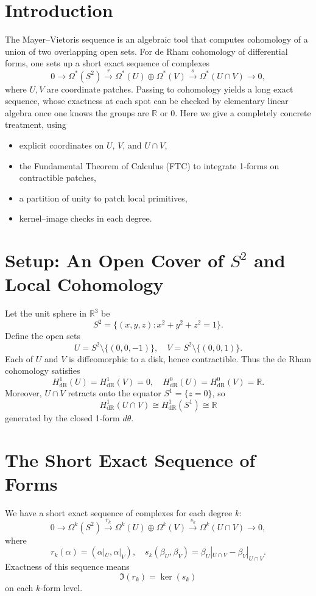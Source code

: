 \documentclass[11pt]{article}
\newcommand{\R}{\mathbb{R}}
\begin{document}
	\section{Introduction}
	The Mayer–Vietoris sequence is an algebraic tool that computes cohomology of a union of two overlapping open sets.  For de Rham cohomology of differential forms, one sets up a short exact sequence of complexes
	\[
	0\rightarrow \Omega^*(S^2) \xrightarrow{r} 
	\Omega^*(U)\oplus\Omega^*(V) \xrightarrow{s} \Omega^*(U\cap V) \rightarrow 0,
	\]
	where $U,V$ are coordinate patches.  Passing to cohomology yields a long exact sequence, whose exactness at each spot can be checked by elementary linear algebra once one knows the groups are $\R$ or $0$.  Here we give a completely concrete treatment, using
	\begin{itemize}
		\item explicit coordinates on $U$, $V$, and $U\cap V$,
		\item the Fundamental Theorem of Calculus (FTC) to integrate 1‑forms on contractible patches,
		\item a partition of unity to patch local primitives,
		\item kernel–image checks in each degree.
	\end{itemize}
	
	\section{Setup: An Open Cover of $S^2$ and Local Cohomology}
	Let the unit sphere in $\R^3$ be
	\[
	S^2=\{(x,y,z):x^2+y^2+z^2=1\}.
	\]
	Define the open sets
	\[
	U=S^2\setminus\{(0,0,-1)\},
	\quad
	V=S^2\setminus\{(0,0,1)\}.
	\]
	Each of $U$ and $V$ is diffeomorphic to a disk, hence contractible.  Thus the de Rham cohomology satisfies
	\[
	H^1_{\mathrm{dR}}(U)=H^1_{\mathrm{dR}}(V)=0,
	\quad
	H^0_{\mathrm{dR}}(U)=H^0_{\mathrm{dR}}(V)=\R.
	\]
	Moreover, $U\cap V$ retracts onto the equator $S^1=\{z=0\}$, so
	\[
	H^1_{\mathrm{dR}}(U\cap V)\cong H^1_{\mathrm{dR}}(S^1)\cong\R
	\]
	generated by the closed 1‑form $d\theta$.
	
	\section{The Short Exact Sequence of Forms}
	We have a short exact sequence of complexes for each degree $k$:
	\[
	0\longrightarrow\Omega^k(S^2) \xrightarrow{r_k} \Omega^k(U)\oplus \Omega^k(V) \xrightarrow{s_k} \Omega^k(U\cap V) \longrightarrow 0,
	\]
	where
	\[
	r_k(\alpha)=(\alpha|_U,\alpha|_V),
	\quad
	s_k(\beta_U,\beta_V)=\beta_U|_{U\cap V}-\beta_V|_{U\cap V}.
	\]
	Exactness of this sequence means
	\[\Im(r_k)=\ker(s_k)\]
	on each $k$‑form level.
	
\end{document}
